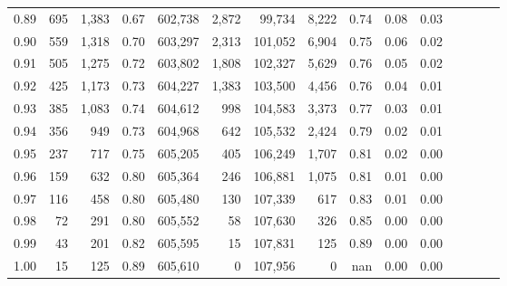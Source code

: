 \begin{tabular}{rrrcrrrrrrrrrrr}
0.89 &     695 &  1,383 &                                       0.67 &  602,738 &    2,872 &   99,734 &    8,222 &  0.74 &  0.08 &                         0.03 \\
0.90 &     559 &  1,318 &                                       0.70 &  603,297 &    2,313 &  101,052 &    6,904 &  0.75 &  0.06 &                         0.02 \\
0.91 &     505 &  1,275 &                                       0.72 &  603,802 &    1,808 &  102,327 &    5,629 &  0.76 &  0.05 &                         0.02 \\
0.92 &     425 &  1,173 &                                       0.73 &  604,227 &    1,383 &  103,500 &    4,456 &  0.76 &  0.04 &                         0.01 \\
0.93 &     385 &  1,083 &                                       0.74 &  604,612 &      998 &  104,583 &    3,373 &  0.77 &  0.03 &                         0.01 \\
0.94 &     356 &    949 &                                       0.73 &  604,968 &      642 &  105,532 &    2,424 &  0.79 &  0.02 &                         0.01 \\
0.95 &     237 &    717 &                                       0.75 &  605,205 &      405 &  106,249 &    1,707 &  0.81 &  0.02 &                         0.00 \\
0.96 &     159 &    632 &                                       0.80 &  605,364 &      246 &  106,881 &    1,075 &  0.81 &  0.01 &                         0.00 \\
0.97 &     116 &    458 &                                       0.80 &  605,480 &      130 &  107,339 &      617 &  0.83 &  0.01 &                         0.00 \\
0.98 &      72 &    291 &                                       0.80 &  605,552 &       58 &  107,630 &      326 &  0.85 &  0.00 &                         0.00 \\
0.99 &      43 &    201 &                                       0.82 &  605,595 &       15 &  107,831 &      125 &  0.89 &  0.00 &                         0.00 \\
1.00 &      15 &    125 &                                       0.89 &  605,610 &        0 &  107,956 &        0 &   nan &  0.00 &                         0.00 \\
\bottomrule
\end{tabular}
